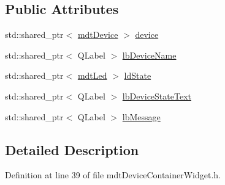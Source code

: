 \subsection*{Public Attributes}
\begin{DoxyCompactItemize}
\item 
std\-::shared\-\_\-ptr$<$ \hyperlink{classmdt_device}{mdt\-Device} $>$ \hyperlink{classmdt_device_container_widget_private_1_1mdt_device_container_widget_item_a29d58ab690d64325b60b39817afcf4a4}{device}
\item 
std\-::shared\-\_\-ptr$<$ Q\-Label $>$ \hyperlink{classmdt_device_container_widget_private_1_1mdt_device_container_widget_item_a8233b97854de9e3b3c391d2f19f7320a}{lb\-Device\-Name}
\item 
std\-::shared\-\_\-ptr$<$ \hyperlink{classmdt_led}{mdt\-Led} $>$ \hyperlink{classmdt_device_container_widget_private_1_1mdt_device_container_widget_item_affa159e1f4c9b4392e2339ae067d2f0f}{ld\-State}
\item 
std\-::shared\-\_\-ptr$<$ Q\-Label $>$ \hyperlink{classmdt_device_container_widget_private_1_1mdt_device_container_widget_item_a90e0b939fb6e476fc2d17e620d2f6ed6}{lb\-Device\-State\-Text}
\item 
std\-::shared\-\_\-ptr$<$ Q\-Label $>$ \hyperlink{classmdt_device_container_widget_private_1_1mdt_device_container_widget_item_af2dffac7204f93f210794c6800f54b28}{lb\-Message}
\end{DoxyCompactItemize}


\subsection{Detailed Description}


Definition at line 39 of file mdt\-Device\-Container\-Widget.\-h.



